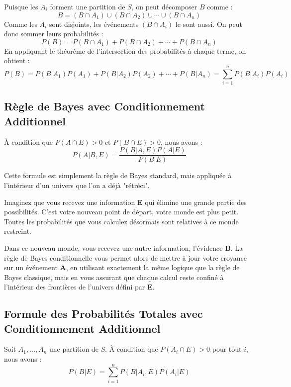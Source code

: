 \begin{proofbox}
Puisque les $A_i$ forment une partition de $S$, on peut décomposer $B$ comme :
$$B = (B \cap A_1) \cup (B \cap A_2) \cup \cdots \cup (B \cap A_n)$$
Comme les $A_i$ sont disjoints, les événements $(B \cap A_i)$ le sont aussi. On peut donc sommer leurs probabilités :
$$P(B) = P(B \cap A_1) + P(B \cap A_2) + \cdots + P(B \cap A_n)$$
En appliquant le théorème de l'intersection des probabilités à chaque terme, on obtient :
$$P(B) = P(B|A_1)P(A_1) + P(B|A_2)P(A_2) + \cdots + P(B|A_n) = \sum_{i=1}^{n} P(B|A_i)P(A_i)$$
\end{proofbox}

\subsection{Règle de Bayes avec Conditionnement Additionnel}

\begin{theorembox}
À condition que $P(A \cap E) > 0$ et $P(B \cap E) > 0$, nous avons :
$$P(A|B, E) = \frac{P(B|A, E)P(A|E)}{P(B|E)}$$
\end{theorembox}

\begin{intuitionbox}
Cette formule est simplement la règle de Bayes standard, mais appliquée à l'intérieur d'un univers que l'on a déjà "rétréci".

Imaginez que vous recevez une information \textbf{E} qui élimine une grande partie des possibilités. C'est votre nouveau point de départ, votre monde est plus petit. Toutes les probabilités que vous calculez désormais sont relatives à ce monde restreint.

Dans ce nouveau monde, vous recevez une autre information, l'évidence \textbf{B}. La règle de Bayes conditionnelle vous permet alors de mettre à jour votre croyance sur un événement \textbf{A}, en utilisant exactement la même logique que la règle de Bayes classique, mais en vous assurant que chaque calcul reste confiné à l'intérieur des frontières de l'univers défini par \textbf{E}.
\end{intuitionbox}

\subsection{Formule des Probabilités Totales avec Conditionnement Additionnel}

\begin{theorembox}
Soit $A_1, \dots, A_n$ une partition de $S$. À condition que $P(A_i \cap E) > 0$ pour tout $i$, nous avons :
$$P(B|E) = \sum_{i=1}^{n} P(B|A_i, E)P(A_i|E)$$
\end{theorembox}

